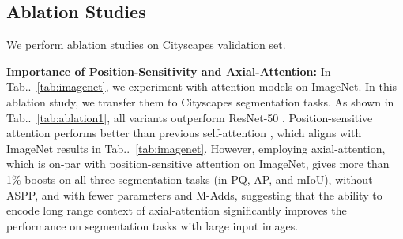 \documentclass[runningheads]{llncs}
\makeatletter
\DeclareRobustCommand\onedot{\futurelet\@let@token\@onedot}
\def\@onedot{\ifx\@let@token.\else.\null\fi\xspace}
\newcommand{\tabref}[1]{Tab\onedot~\ref{#1}}
\makeatother
\begin{document}
\subsection{Ablation Studies}

We perform ablation studies on Cityscapes validation set.

{\bf Importance of Position-Sensitivity and Axial-Attention:} In \tabref{tab:imagenet}, we experiment with attention models on ImageNet. In this ablation study, we transfer them to Cityscapes segmentation tasks. As shown in \tabref{tab:ablation1}, all variants outperform ResNet-50 \cite{he2016deep}. Position-sensitive attention performs better than previous self-attention \cite{parmar2019stand}, which aligns with ImageNet results in \tabref{tab:imagenet}. However, employing axial-attention, which is on-par with position-sensitive attention on ImageNet, gives more than 1\% boosts on all three segmentation tasks (in PQ, AP, and mIoU), without ASPP, and with fewer parameters and M-Adds, suggesting that the ability to encode long range context of axial-attention significantly improves the performance on segmentation tasks with large input images. 
\end{document}
